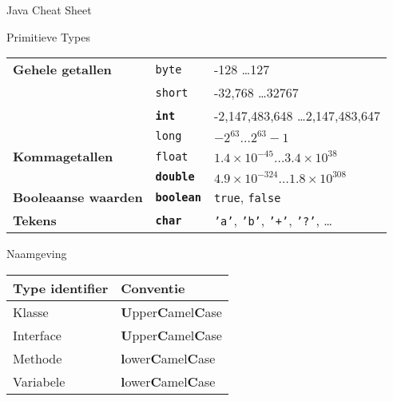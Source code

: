 \documentclass[a4paper]{article}
\renewcommand{\section}[1]{
  \begin{center}
    \Huge\sc #1
  \end{center}
}
\begin{document}
\begin{center}
  \Huge Java Cheat Sheet
\end{center}

\section{Primitieve Types}
\begin{center}
  \begin{tabular}{lll}
    {\bf Gehele getallen} & {\tt byte} & -128 \dots 127 \\ \cmidrule{2-3}
                          & {\tt short} & -32,768 \dots 32767 \\ \cmidrule{2-3}
                          & {\tt\bfseries int} & -2,147,483,648 \dots 2,147,483,647 \\ \cmidrule{2-3}
                          & {\tt long} & $-2^{63} \dots 2^{63}-1$ \\
    \midrule
    {\bf Kommagetallen} & {\tt float} & $1.4 \times 10^{-45} \dots 3.4 \times 10^{38}$ \\ \cmidrule{2-3}
                        & {\tt\bfseries double} & $4.9 \times 10^{-324} \dots 1.8 \times 10^{308}$ \\
    \midrule
    {\bf Booleaanse waarden} & {\tt\bfseries boolean} & {\tt true}, {\tt false} \\
    \midrule
    {\bf Tekens}        & {\tt\bfseries char} & {\tt 'a'}, {\tt 'b'}, {\tt '+'}, {\tt '?'}, \dots
  \end{tabular}
\end{center}

\vfil

\section{Naamgeving}
\begin{center}
  \begin{tabular}{ll}
    Type identifier & Conventie \\
    \toprule
    Klasse & {\bf U}pper{\bf C}amel{\bf C}ase \\
    Interface & {\bf U}pper{\bf C}amel{\bf C}ase \\
    Methode & {\bf l}ower{\bf C}amel{\bf C}ase \\
    Variabele & {\bf l}ower{\bf C}amel{\bf C}ase \\
  \end{tabular}
\end{center}
\end{document}
